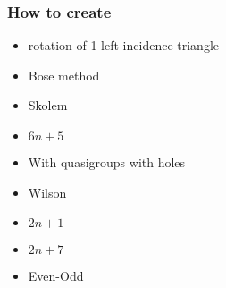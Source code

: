 \begin{frame}
	\frametitle{How to create}
	\begin{itemize}
		\item rotation of 1-left incidence triangle
		\item Bose method
		\item Skolem
		\item $6n + 5$
		\item With quasigroups with holes
		\item Wilson
		\item $2n +1$
		\item $2n +7$
		\item Even-Odd
	\end{itemize}
	
	\end{frame}